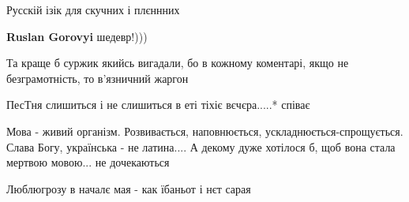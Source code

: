 \begin{itemize}
{%
 

Русскій ізік для скучних і плєннних

\begin{itemize}{
 
\textbf{Ruslan Gorovyi} шедевр!)))
}\end{itemize}

 
Та краще б суржик якийсь вигадали, бо в кожному коментарі, якщо не безграмотність, то в'язничний жаргон

 
ПесТня слишиться і не слишиться в еті тіхіє вєчєра.....* співає

 

Мова - живий організм. Розвивається, наповнюється, ускладнюється-спрощується.
Слава Богу, українська - не латина.... А декому дуже хотілося б, щоб вона стала
мертвою мовою... не дочекаються


 
Люблюгрозу в началє мая - как їбаньот і нєт сарая

}
\end{itemize}

